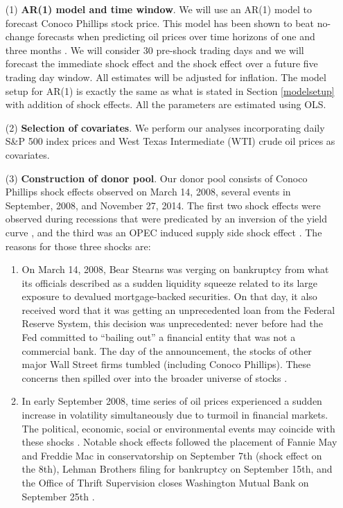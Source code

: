 \documentclass[11pt]{article}
\theoremstyle{definition}
\begin{document}
\begin{enumerate}
\item[(1)] {\bf AR(1) model and time window}. We will use an AR(1) model to forecast Conoco Phillips stock price. This model has been shown to beat no-change forecasts when predicting oil prices over time horizons of one and three months \citep{alquist2013forecasting}. We will consider 30 pre-shock trading days and we will forecast the immediate shock effect and the shock effect over a future five trading day window. All estimates will be adjusted for inflation. The model setup for AR(1) is exactly the same as what is stated in Section \ref{modelsetup} with addition of shock effects. All the parameters are estimated using OLS.
\item[(2)] {\bf Selection of covariates}. We perform our analyses incorporating daily S\&P 500 index prices and West Texas Intermediate (WTI) crude oil prices as covariates. 
\item[(3)] {\bf Construction of donor pool}. Our donor pool  consists of Conoco Phillips shock effects observed on March 14, 2008, several events in September, 2008, and November 27, 2014. The first two shock effects were observed during recessions that were predicated by an inversion of the yield curve \citep{bauer2018economic}, and the third was an OPEC induced supply side shock effect \citep{huppmann2015opec}. The reasons for those three shocks are:
  \begin{enumerate}
  \item On March 14, 2008, Bear Stearns was verging on bankruptcy from what its officials described as a sudden liquidity squeeze related to its large exposure to devalued mortgage-backed securities. On that day, it also received word that it was getting an unprecedented loan from the Federal Reserve System, this decision was unprecedented: never before had the Fed committed to ``bailing out'' a financial entity that was not a commercial bank. The day of the announcement, the stocks of other major Wall Street firms tumbled (including Conoco Phillips). These concerns then spilled over into the broader universe of stocks \citep{shorter2008bear}. %
  \item  In early September 2008, time series of oil prices experienced a sudden increase in volatility simultaneously due to turmoil in financial markets. The political, economic, social or environmental events may coincide with these shocks \citep{ewing2013volatility}. Notable shock effects followed the placement of Fannie May and Freddie Mac in conservatorship on September 7th (shock effect on the 8th), Lehman Brothers filing for bankruptcy on September 15th, and the Office of Thrift Supervision closes Washington Mutual Bank on September 25th \citep{dwyer2009financial, longstaff2010subprime}.

\end{enumerate}
\end{enumerate}
\end{document}
